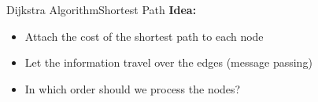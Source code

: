 
\begin{frame}{Dijkstra Algorithm}{Shortest Path}
  \textbf{Idea:}
  \begin{itemize}
    \item
      Attach the cost of the shortest path to each node
    \item
      Let the information travel over the edges (message passing)
    \item
      In which order should we process the nodes?
  \end{itemize}
\end{frame}


